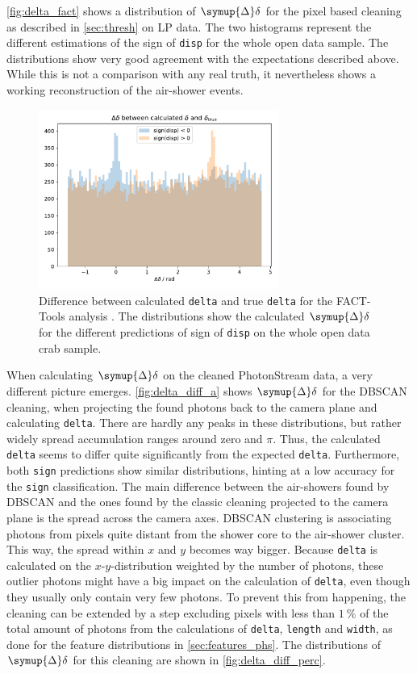 \autoref{fig:delta_fact} shows a distribution of $\symup{\Delta}\delta$ for
the pixel based cleaning as described in \autoref{sec:thresh} on LP data.
The two histograms represent the different estimations of the sign of
\texttt{disp} for the whole open data sample. The distributions show very
good agreement with the expectations described above. While this is not a
comparison with any real truth, it nevertheless shows a working
reconstruction of the air-shower events.
%
\begin{figure}
  \centering
  \includegraphics[width=0.7\textwidth]{Plots/delta_delta/delta_delta_facttools.pdf}
  \caption{Difference between calculated \texttt{delta} and true \texttt{delta} for the FACT-Tools analysis \cite{openana}. The distributions show the calculated $\symup{\Delta}\delta$ for the different predictions of sign of \texttt{disp} on the whole open data crab sample.}
  \label{fig:delta_fact}
\end{figure}
%
When calculating $\symup{\Delta}\delta$ on the cleaned PhotonStream data, a
very different picture emerges. \autoref{fig:delta_diff_a} shows
$\symup{\Delta}\delta$ for the DBSCAN cleaning, when projecting the found
photons back to the camera plane and calculating \texttt{delta}. There are
hardly any peaks in these distributions, but rather widely spread
accumulation ranges around zero and $\pi$. Thus, the calculated
\texttt{delta} seems to differ quite significantly from the expected
\texttt{delta}. Furthermore, both \texttt{sign} predictions show similar
distributions, hinting at a low accuracy for the \texttt{sign}
classification. The main difference between the air-showers found by DBSCAN
and the ones found by the classic cleaning projected to the camera plane is
the spread across the camera axes. DBSCAN clustering is associating photons
from pixels quite distant from the shower core to the air-shower cluster.
This way, the spread within $x$ and $y$ becomes way bigger. Because
\texttt{delta} is calculated on the $x$-$y$-distribution weighted by the
number of photons, these outlier photons might have a big impact on the
calculation of \texttt{delta}, even though they usually only contain very
few photons. To prevent this from happening, the cleaning can be extended by
a step excluding pixels with less than $\SI{1}{\percent}$ of the total
amount of photons from the calculations of \texttt{delta}, \texttt{length}
and \texttt{width}, as done for the feature distributions in \autoref{sec:features_phs}. The distributions of $\symup{\Delta}\delta$ for this
cleaning are shown in \autoref{fig:delta_diff_perc}.

